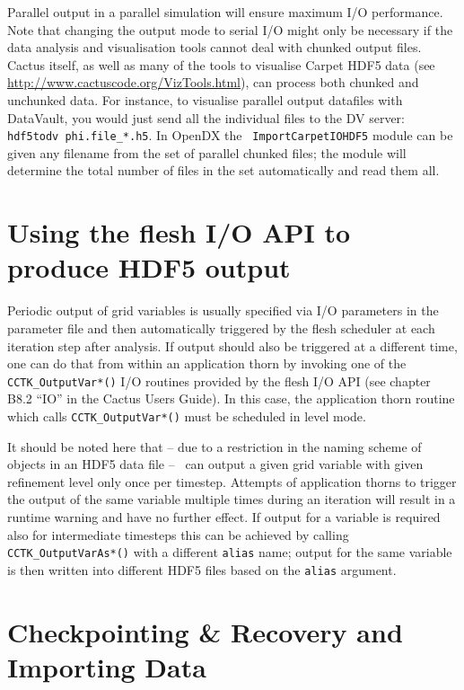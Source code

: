 \documentclass{article}
\begin{document}
Parallel output in a parallel simulation will ensure maximum I/O
performance. Note that changing the output mode to serial I/O might only be
necessary if the data analysis and visualisation tools cannot deal with
chunked output files. Cactus itself, as well as many of the tools to
visualise Carpet HDF5 data (see \url{http://www.cactuscode.org/VizTools.html}),
can process both chunked and unchunked data. For instance, to visualise parallel
output datafiles with DataVault, you would just send all the individual files
to the DV server: {\tt hdf5todv phi.file\_*.h5}. In OpenDX the {\tt
ImportCarpetIOHDF5} module can be given any filename from the set of parallel
chunked files; the module will determine the total number of files in the set
automatically and read them all.


\section{Using the flesh I/O API to produce HDF5 output}

Periodic output of grid variables is usually specified via I/O parameters
in the parameter file and then automatically triggered by the flesh scheduler
at each iteration step after analysis. If output should also be triggered
at a different time, one can do that from within an application thorn by
invoking one of the {\tt CCTK\_OutputVar*()} I/O routines provided
by the flesh I/O API (see chapter B8.2 ``IO'' in the Cactus Users Guide).
In this case, the application thorn routine which calls {\tt CCTK\_OutputVar*()}
must be scheduled in level mode.

It should be noted here that -- due to a restriction in the naming scheme of
objects in an HDF5 data file -- \ThisThorn\ can output a given grid variable
with given refinement level only once per timestep. Attempts of application
thorns to trigger the output of the same variable multiple times during an iteration
will result in a runtime warning and have no further effect.
If output for a variable is required also for intermediate timesteps
this can be achieved by calling {\tt CCTK\_OutputVarAs*()} with a different
{\tt alias} name; output for the same variable is then written into
different HDF5 files based on the {\tt alias} argument.


\section{Checkpointing \& Recovery and Importing Data}
\end{document}
